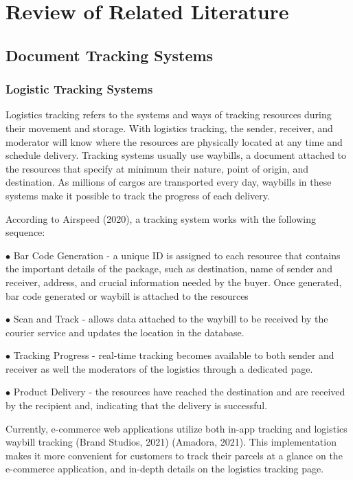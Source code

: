 \chapter{Review of Related Literature}
\label{sec:relatedlit}

\section{Document Tracking Systems}

\subsection{Logistic Tracking Systems}
Logistics tracking refers to the systems and ways of tracking resources during their movement and storage. With logistics tracking, the sender, receiver, and moderator will know where the resources are physically located at any time and schedule delivery. Tracking systems usually use waybills, a document attached to the resources that specify at minimum their nature, point of origin, and destination.\cite{waybill} As millions of cargos are transported every day, waybills in these systems make it possible to track the progress of each delivery. 

According to Airspeed (2020), a tracking system works with the following sequence:
\begin{description}
   \item $\bullet$ Bar Code Generation - a unique ID is assigned to each resource that contains the important details of the package, such as destination, name of sender and receiver, address, and crucial information needed by the buyer. Once generated, bar code generated or waybill is attached to the resources
   \item $\bullet$ Scan and Track - allows data attached to the waybill to be received by the courier service and updates the location in the database.
   \item $\bullet$ Tracking Progress - real-time tracking becomes available to both sender and receiver as well the moderators of the logistics through a dedicated page.
   \item $\bullet$ Product Delivery - the resources have reached the destination and are received by the recipient and, indicating that the delivery is successful.
\end{description}

Currently, e-commerce web applications utilize both in-app tracking and logistics waybill tracking (Brand Studios, 2021) (Amadora, 2021). This implementation makes it more convenient for customers to track their parcels at a glance on the e-commerce application, and in-depth details on the logistics tracking page. 

